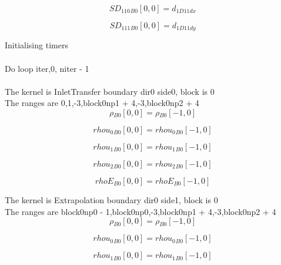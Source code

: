\documentclass{article}
\begin{document}
\begin{dmath}{SD_{110}{_{B0}}}[{0,0}] = d_{1 D11 dx}\end{dmath}

\begin{dmath}{SD_{111}{_{B0}}}[{0,0}] = d_{1 D11 dy}\end{dmath}

\noindent Initialising timers\\
\\\noindent Do loop iter,0, niter - 1\\
\\\noindent The kernel is InletTransfer boundary dir0 side0, block is 0\\\noindent The ranges are 0,1,-3,block0np1 + 4,-3,block0np2 + 4\\\begin{dmath}{\rho{_{B0}}}[{0,0}] = {\rho{_{B0}}}[{-1,0}]\end{dmath}

\begin{dmath}{rhou_{0}{_{B0}}}[{0,0}] = {rhou_{0}{_{B0}}}[{-1,0}]\end{dmath}

\begin{dmath}{rhou_{1}{_{B0}}}[{0,0}] = {rhou_{1}{_{B0}}}[{-1,0}]\end{dmath}

\begin{dmath}{rhou_{2}{_{B0}}}[{0,0}] = {rhou_{2}{_{B0}}}[{-1,0}]\end{dmath}

\begin{dmath}{rhoE{_{B0}}}[{0,0}] = {rhoE{_{B0}}}[{-1,0}]\end{dmath}

\noindent The kernel is Extrapolation boundary dir0 side1, block is 0\\\noindent The ranges are block0np0 - 1,block0np0,-3,block0np1 + 4,-3,block0np2 + 4\\\begin{dmath}{\rho{_{B0}}}[{0,0}] = {\rho{_{B0}}}[{-1,0}]\end{dmath}

\begin{dmath}{rhou_{0}{_{B0}}}[{0,0}] = {rhou_{0}{_{B0}}}[{-1,0}]\end{dmath}

\begin{dmath}{rhou_{1}{_{B0}}}[{0,0}] = {rhou_{1}{_{B0}}}[{-1,0}]\end{dmath}
\end{document}
